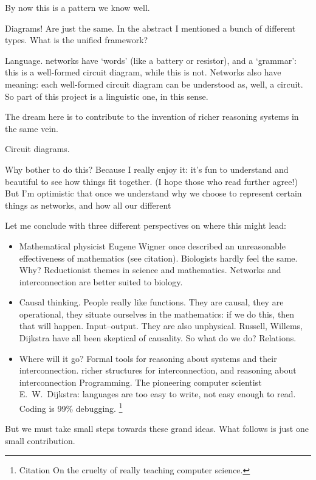 By now this is a pattern we know well. 

Diagrams! Are just the same. In the abstract I mentioned a bunch of different
types. What is the unified framework? 

Language. networks have `words' (like a battery or resistor), and a `grammar':
this is a well-formed circuit diagram, while this is not. Networks also have
meaning: each well-formed circuit diagram can be understood as, well, a circuit.
So part of this project is a linguistic one, in this sense.

The dream here is to contribute to the invention of richer reasoning systems in
the same vein.

Circuit diagrams.

Why bother to do this? Because I really enjoy it: it's fun to understand and
beautiful to see how things fit together. (I hope those who read further agree!)
But I'm optimistic that once we understand why we choose to represent certain
things as networks, and how all our different 

Let me conclude with three different perspectives on where this might lead:

\begin{itemize}
  \item Mathematical physicist Eugene Wigner once described an unreasonable effectiveness of mathematics (see
citation). Biologists hardly feel the same.
Why? Reductionist themes in science and mathematics. Networks and interconnection are better suited to biology.

\item Causal thinking. 
People really like functions. They are causal, they are operational, they situate ourselves in the mathematics: if we do this, then that will happen. Input--output. They are also unphysical. Russell, Willems, Dijkstra have all been skeptical of causality. So what do we do? Relations.

\item Where will it go? Formal tools for reasoning about systems and their
  interconnection.  richer structures for interconnection, and reasoning about
  interconnection Programming. The pioneering computer scientist E.\ W.\
  Dijkstra: languages are too easy to write, not easy enough to read. Coding is
  99\% debugging. \footnote{Citation On the cruelty of really teaching computer
  science.}
\end{itemize}

But we must take small steps towards these grand ideas. What follows is just one
small contribution.

